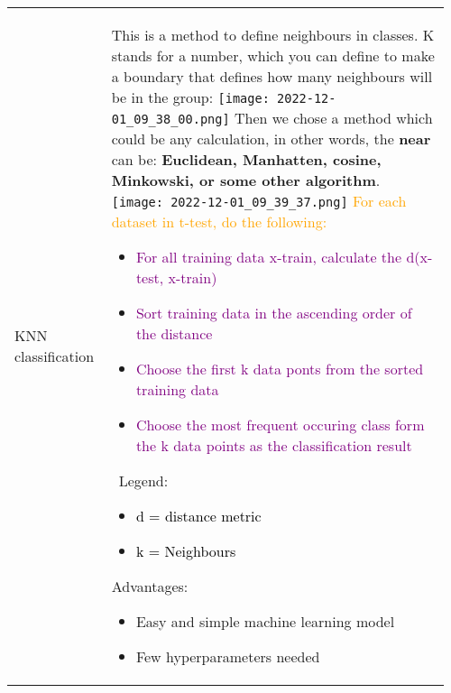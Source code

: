 \documentclass[main.tex,fontsize=8pt,paper=a4,paper=portrait,DIV=calc,]{scrartcl}
\begin{document}
\begin{table}[ht!]
\begin{tabular}{|m{0.2\linewidth}|m{0.755\linewidth}|}
\hline
KNN classification & 
This is a method to define neighbours in classes. \newline
K stands for a number, which you can define to make a boundary that defines how many neighbours will be in the group:\newline
\texttt{[image: 2022-12-01\_09\_38\_00.png]}\newline
Then we chose a method which could be any calculation,\newline
in other words, the \textbf{near} can be: \textbf{Euclidean, Manhatten, cosine, Minkowski, or some other algorithm}.\newline
\texttt{[image: 2022-12-01\_09\_39\_37.png]}\newline
\textcolor{orange}{For each dataset in t-test, do the following:}\newline
\begin{itemize}
\item \textcolor{purple}{For all training data x-train, calculate the d(x-test, x-train)}
\item \textcolor{purple}{Sort training data in the ascending order of the distance}
\item \textcolor{purple}{Choose the first k data ponts from the sorted training data}
\item \textcolor{purple}{Choose the most frequent occuring class form the k data points as the classification result}
\end{itemize} 
\, \newline
Legend:\newline
\begin{itemize}
\item \textcolor{black}{d = distance metric}
\item \textcolor{black}{k = Neighbours}
\end{itemize}
\minipg{
\textcolor{OliveGreen}{Advantages:}\newline
\begin{itemize}
\item \textcolor{OliveGreen}{Easy and simple machine learning model}
\item \textcolor{OliveGreen}{Few hyperparameters needed}
  \vspace{2mm}
  \vspace{2mm}
  \vspace{2mm}
\end{itemize}
}
\end{tabular}
\end{table}
\end{document}
